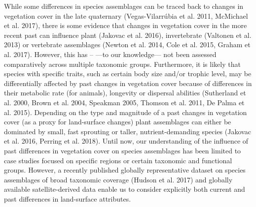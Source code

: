 While some differences in species assemblages can be traced back to changes in vegetation cover in the late quaternary (Vegas-Vilarrúbia et al. 2011, McMichael et al. 2017), there is some evidence that changes in vegetation cover in the more recent past can influence plant (Jakovac et al. 2016), invertebrate (Valtonen et al. 2013) or vertebrate assemblages (Newton et al. 2014, Cole et al. 2015, Graham et al. 2017). However, this has – —to our knowledge—  not been assessed comparatively across multiple taxonomic groups. Furthermore, it is likely that species with specific traits, such as certain body size and/or trophic level, may be differentially affected by past changes in vegetation cover because of differences in their metabolic rate (for animals), longevity or dispersal abilities (Sutherland et al. 2000, Brown et al. 2004, Speakman 2005, Thomson et al. 2011, De Palma et al. 2015). Depending on the type and magnitude of a past changes in vegetation cover (as a proxy for land-surface changes) plant assemblages can either be dominated by small, fast sprouting  or taller, nutrient-demanding species (Jakovac et al. 2016, Perring et al. 2018). Until now, our understanding of the influence of past differences in vegetation cover on species assemblages has been limited to case studies focused on specific regions or certain taxonomic and functional groups. However, a recently published globally representative dataset on species assemblages of broad taxonomic coverage (Hudson et al. 2017) and globally available satellite-derived data enable us to consider explicitly both current and past differences in land-surface attributes.
